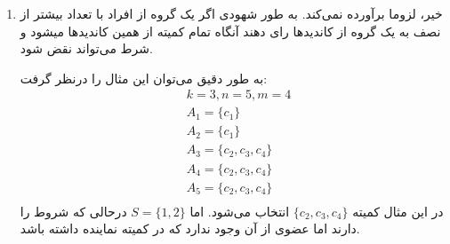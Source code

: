 \documentclass[12pt]{article}
\begin{document}
\begin{enumerate}
{\begin{itemize}
{                اما در هسته بودن خاصیت قوی‌تری است. به طور شهودی دلیل آن این است که 
                گروه‌های بزرگی که لزوما به اندازه بزرگیشان اشتراک ندارند ممکن است
                کمیته را بلوکه کنند، در حالی که اصلا شروط اولیه 
                را برآورده نمی‌کنند. با یک مثال این موضوع را نشان می‌دهیم:

                        \begin{align*}
            &k=3, n=6, m=5 \\
            &A_1 = \{c_1\} \\ 
            &A_2 = \{c_1, c_2, c_3\} \\ 
            &A_3 = \{c_1, c_2, c_4\} \\ 
            &A_4 = \{c_1, c_2, c_5\} \\ 
            &A_5 = \{c_3, c_4, c_5\} \\ 
            &A_6 = \{c_3, c_4, c_5\} \\
            \\ 
            &W = \{c_3, c_4, c_5\}
        \end{align*}

        در این مثال، کمیته داده شده دارای
        است. چراکه اگر $S$
        دوعضوی باشد حتما یکی از آنها کاندیدی با شماره بالاتر از یک دارند، و اگر چهار
        عضوی باشد، آنگاه در شرط اولیه 
        صدق نمی‌کند. اما این کمیته در هسته نیست.
        در نظر می‌گیریم:
        \begin{align*}
            S &= \{1, 2, 3, 4\} \\
            T &= \{c_1, c_2\}
        \end{align*}

        در این صورت به راحتی قابل مشاهده است که $S$
        این کمیته را بلوکه می‌کند.

        درنتیجه در هسته بودن، قوی‌تر از 
        است.

                
            }
        \end{itemize}
    }
    \item {
        خیر، لزوما برآورده نمی‌کند. به طور شهودی اگر یک گروه از افراد با تعداد
        بیشتر از نصف به یک گروه از کاندیدها رای دهند آنگاه تمام کمیته از همین
        کاندیدها میشود
        و شرط 
        می‌تواند نقض شود.

        به طور دقیق می‌توان این مثال را درنظر گرفت:
        \begin{align*}
            &k=3, n=5, m=4 \\
            &A_1 = \{c_1\} \\ 
            &A_2 = \{c_1\} \\ 
            &A_3 = \{c_2, c_3, c_4\} \\ 
            &A_4 = \{c_2, c_3, c_4\} \\ 
            &A_5 = \{c_2, c_3, c_4\} \\ 
        \end{align*}
        در این مثال کمیته
        $\{c_2, c_3, c_4\}$
        انتخاب می‌شود. اما
        $S = \{1,2\}$
        درحالی که شروط 
        را دارند اما عضوی از آن وجود ندارد که در کمیته نماینده داشته باشد.
        
}
\end{enumerate}
\end{document}
